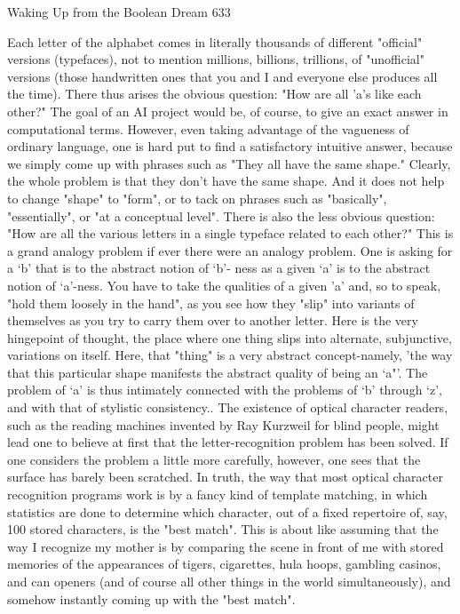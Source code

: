 Waking Up from the Boolean Dream                                                     633

         Each letter of the alphabet comes in literally thousands of different "official"
versions (typefaces), not to mention millions, billions, trillions, of "unofficial"
versions (those handwritten ones that you and I and everyone else produces all the
time). There thus arises the obvious question: "How are all 'a's like each other?" The
goal of an AI project would be, of course, to give an exact answer in computational
terms. However, even taking advantage of the vagueness of ordinary language, one is
hard put to find a satisfactory intuitive answer, because we simply come up with
phrases such as "They all have the same shape." Clearly, the whole problem is that
they don't have the same shape. And it does not help to change "shape" to "form", or
to tack on phrases such as "basically", "essentially", or "at a conceptual level".
         There is also the less obvious question: "How are all the various letters in a
single typeface related to each other?" This is a grand analogy problem if ever there
were an analogy problem. One is asking for a `b' that is to the abstract notion of `b'-
ness as a given `a' is to the abstract notion of `a'-ness. You have to take the qualities of
a given 'a' and, so to speak, "hold them loosely in the hand", as you see how they
"slip" into variants of themselves as you try to carry them over to another letter. Here
is the very hingepoint of thought, the place where one thing slips into alternate,
subjunctive, variations on itself. Here, that "thing" is a very abstract concept-namely,
'the way that this particular shape manifests the abstract quality of being an `a"'. The
problem of `a' is thus intimately connected with the problems of `b' through `z', and
with that of stylistic consistency..
         The existence of optical character readers, such as the reading machines
invented by Ray Kurzweil for blind people, might lead one to believe at first that the
letter-recognition problem has been solved. If one considers the problem a little more
carefully, however, one sees that the surface has barely been scratched. In truth, the
way that most optical character recognition programs work is by a fancy kind of
template matching, in which statistics are done to determine which character, out of a
fixed repertoire of, say, 100 stored characters, is the "best match". This is about like
assuming that the way I recognize my mother is by comparing the scene in front of
me with stored memories of the appearances of tigers, cigarettes, hula hoops,
gambling casinos, and can openers (and of course all other things in the world
simultaneously), and somehow instantly coming up with the "best match".

